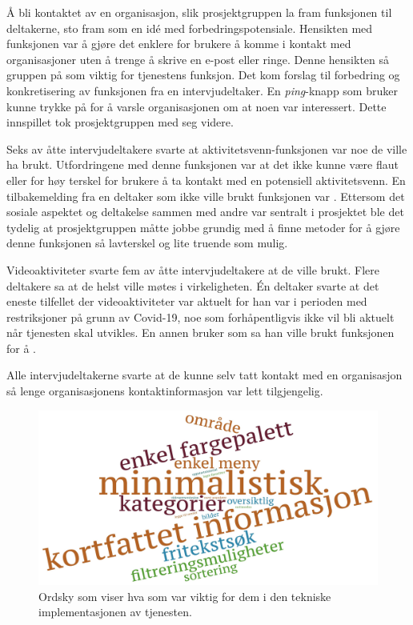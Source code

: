 Å bli kontaktet av en organisasjon, slik prosjektgruppen la fram funksjonen til deltakerne, sto fram som en idé med forbedringspotensiale. Hensikten med funksjonen var å gjøre det enklere for brukere å komme i kontakt med organisasjoner uten å trenge å skrive en e-post eller ringe. Denne hensikten så gruppen på som viktig for tjenestens funksjon. Det kom forslag til forbedring og konkretisering av funksjonen fra en intervjudeltaker. En {\em  ping}-knapp som bruker kunne trykke på for å varsle organisasjonen om at noen var interessert. Dette innspillet tok prosjektgruppen med seg videre.

Seks av åtte intervjudeltakere svarte at aktivitetsvenn-funksjonen var noe de ville ha brukt. Utfordringene med denne funksjonen var at det ikke kunne være flaut eller for høy terskel for brukere å ta kontakt med en potensiell aktivitetsvenn. En tilbakemelding fra en deltaker som ikke ville brukt funksjonen var . Ettersom det sosiale aspektet og deltakelse sammen med andre var sentralt i prosjektet ble det tydelig at prosjektgruppen måtte jobbe grundig med å finne metoder for å gjøre denne funksjonen så lavterskel og lite truende som mulig. 

Videoaktiviteter svarte fem av åtte intervjudeltakere at de ville brukt. Flere deltakere sa at de helst ville møtes i virkeligheten. Én deltaker svarte at det eneste tilfellet der videoaktiviteter var aktuelt for han var i perioden med restriksjoner på grunn av Covid-19, noe som forhåpentligvis ikke vil bli aktuelt når tjenesten skal utvikles. En annen bruker som sa han ville brukt funksjonen for å .

Alle intervjudeltakerne svarte at de kunne selv tatt kontakt med en organisasjon så lenge organisasjonens kontaktinformasjon var lett tilgjengelig.

\begin{figure}[H]
\includegraphics[width=\textwidth]{Illustrasjoner/ordsky-funksjoner.jpg}
\caption{Ordsky som viser hva som var viktig for dem i den tekniske implementasjonen av tjenesten.}
\label{fig:ordsky-funksjoner}
\end{figure}

